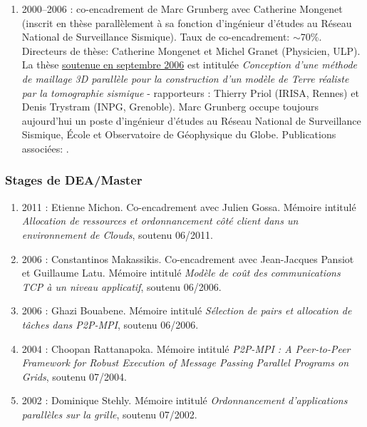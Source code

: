 \begin{enumerate}
\item 2000--2006 : co-encadrement de Marc Grunberg avec Catherine Mongenet 
(inscrit en thèse parallèlement à sa fonction d'ingénieur d'études au Réseau 
National de Surveillance Sismique). Taux de co-encadrement: $\sim$70\%.
Directeurs de thèse: Catherine Mongenet et Michel Granet (Physicien, ULP).
La thèse \underline{soutenue en septembre 2006} est intitulée \textit{Conception 
d'une méthode de maillage 3D parallèle pour la construction d'un modèle de Terre 
réaliste par la tomographie sismique} - rapporteurs : Thierry Priol (IRISA, Rennes) 
et Denis Trystram (INPG, Grenoble).
Marc Grunberg occupe toujours aujourd'hui un poste d'ingénieur d'études au Réseau 
National de Surveillance Sismique, \'{E}cole et Observatoire de Géophysique du Globe.
Publications associées: 
\cite{icps-2002-20,icps-2003-111,icps-2003-113,
      icps-2004-107,icps-2004-124,icps-2005-146,icps-2007-184}.\\



\end{enumerate}

\subsubsection{Stages de DEA/Master}
\begin{enumerate}

\item 2011 : Etienne Michon. Co-encadrement avec Julien Gossa. Mémoire 
intitulé  \textit{Allocation de ressources et ordonnancement côté client dans 
un environnement de Clouds}, soutenu 06/2011.
\item 2006 : Constantinos Makassikis. Co-encadrement avec Jean-Jacques Pansiot 
et Guillaume Latu. Mémoire intitulé \textit{Modèle de coût des communications 
TCP à un niveau applicatif}, soutenu 06/2006.
\item 2006 : Ghazi Bouabene. Mémoire intitulé  \textit{Sélection de pairs et 
allocation de tâches dans P2P-MPI}, soutenu 06/2006.
\item 2004 : Choopan Rattanapoka. Mémoire intitulé  \textit{P2P-MPI : A 
Peer-to-Peer Framework for Robust Execution of Message Passing Parallel 
Programs on Grids}, soutenu 07/2004.
\item 2002 : Dominique Stehly. Mémoire intitulé \textit{Ordonnancement 
d'applications parallèles sur la grille}, soutenu 07/2002.
\end{enumerate}

